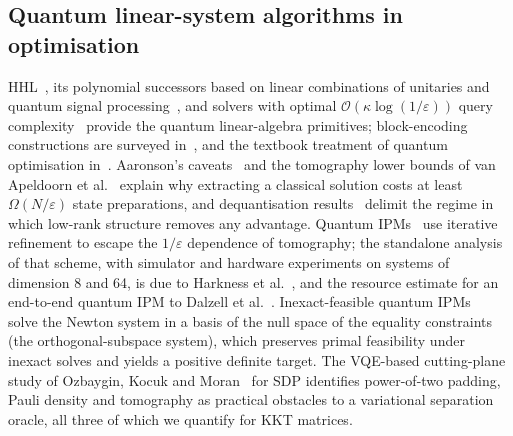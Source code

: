 \documentclass[11pt]{article}
\theoremstyle{definition}
\newcommand{\eps}{\varepsilon}
\newcommand{\bigO}{\mathcal{O}}
\begin{document}
\subsection{Quantum linear-system algorithms in optimisation}
HHL~\cite{harrow2009quantum}, its polynomial successors based on linear combinations of unitaries and quantum signal processing~\cite{childs2017quantum,gilyen2019qsvt,martyn2021grand,lin2020filtering,tong2021fastinversion}, and solvers with optimal $\bigO(\kappa\log(1/\eps))$ query complexity~\cite{costa2022optimal,dalzell2024shortcut} provide the quantum linear-algebra primitives; block-encoding constructions are surveyed in~\cite{camps2024blockencoding,gribling2024lcu}, and the textbook treatment of quantum optimisation in~\cite{nannicini2025book}. Aaronson's caveats~\cite{aaronson2015fineprint} and the tomography lower bounds of van Apeldoorn et al.~\cite{vanapeldoorn2023tomography} explain why extracting a classical solution costs at least $\Omega(N/\eps)$ state preparations, and dequantisation results~\cite{tang2019dequantize} delimit the regime in which low-rank structure removes any advantage. Quantum IPMs~\cite{kerenidis2020qipm,augustino2023qipm,wu2023inexact,mohammadisiahroudi2024efficient,mohammadisiahroudi2025improvements} use iterative refinement to escape the $1/\eps$ dependence of tomography; the standalone analysis of that scheme, with simulator and hardware experiments on systems of dimension 8 and 64, is due to Harkness et al.~\cite{harkness2026ir}, and the resource estimate for an end-to-end quantum IPM to Dalzell et al.~\cite{dalzell2023endtoend}. Inexact-feasible quantum IPMs~\cite{augustino2023qipm,wu2023inexact} solve the Newton system in a basis of the null space of the equality constraints (the orthogonal-subspace system), which preserves primal feasibility under inexact solves and yields a positive definite target. The VQE-based cutting-plane study of Ozbaygin, Kocuk and Moran~\cite{ozbaygin2026vqe} for SDP identifies power-of-two padding, Pauli density and tomography as practical obstacles to a variational separation oracle, all three of which we quantify for KKT matrices.
\end{document}
